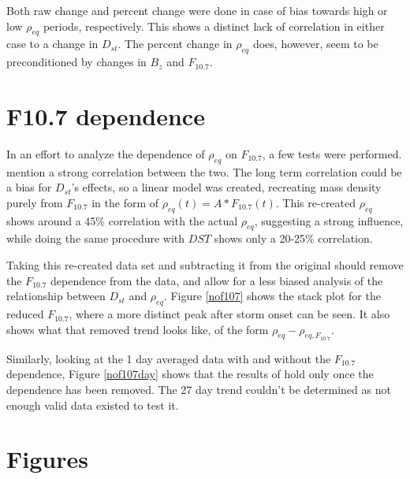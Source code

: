\documentclass[10pt,twocolumn]{article}
\begin{document}
Both raw change and percent change were done in case of bias towards high or low $\rho_{eq}$ periods, respectively. This shows a distinct lack of correlation in either case to a change in $D_{st}$. The percent change in $\rho_{eq}$ does, however, seem to be preconditioned by changes in $B_z$ and $F_{10.7}$.



\section{F10.7 dependence}
In an effort to analyze the dependence of $\rho_{eq}$ on $F_{10.7}$, a few tests were performed. \cite{Takahashi2010} mention a strong correlation between the two. The long term correlation could be a bias for $D_{st}$'s effects, so a linear model was created, recreating mass density purely from $F_{10.7}$ in the form of $\rho_{eq}(t)=A*F_{10.7}(t)$. This re-created $\rho_{eq}$ shows around a 45\% correlation with the actual $\rho_{eq}$, suggesting a strong influence, while doing the same procedure with $DST$ shows only a 20-25\% correlation. 

Taking this re-created data set and subtracting it from the original should remove the $F_{10.7}$ dependence from the data, and allow for a less biased analysis of the relationship between $D_{st}$ and $\rho_{eq}$. Figure \ref{nof107} shows the stack plot for the reduced $F_{10.7}$, where a more distinct peak after storm onset can be seen. It also shows what that removed trend looks like, of the form $\rho_{eq}-\rho_{eq,F_{10.7}}$.



Similarly, looking at the 1 day averaged data with and without the $F_{10.7}$ dependence, Figure \ref{nof107day} shows that the results of \cite{Takahashi2010} hold only once the dependence has been removed. The 27 day trend couldn't be determined as not enough valid data existed to test it.



\newpage
\footnotesize




\section{Figures}
\end{document}
